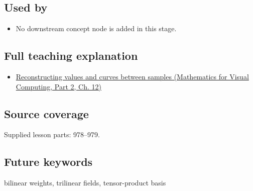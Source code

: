 \subsection{Used by}\label{appendix-0a09b6dfdc86-used-by}

\hypertarget{appendix-0a09b6dfdc86-used-by}{}

\begin{itemize}
\tightlist
\item
  No downstream concept node is added in this stage.
\end{itemize}

\subsection{Full teaching explanation}\label{appendix-0a09b6dfdc86-full-teaching-explanation}

\hypertarget{appendix-0a09b6dfdc86-full-teaching-explanation}{}

\begin{itemize}
\tightlist
\item
  \href{../02-Mathematics-for-Visual-Computing-P02/main.pdf\#nameddest=02-foundations-ii-ch028-reconstructing-values-and-curves-between-samples}{Reconstructing values and curves between samples (Mathematics for Visual Computing, Part 2, Ch. 12)}
\end{itemize}

\subsection{Source coverage}\label{appendix-0a09b6dfdc86-source-coverage}

\hypertarget{appendix-0a09b6dfdc86-source-coverage}{}

Supplied lesson parts: 978--979.

\subsection{Future keywords}\label{appendix-0a09b6dfdc86-future-keywords}

\hypertarget{appendix-0a09b6dfdc86-future-keywords}{}

bilinear weights, trilinear fields, tensor-product basis
